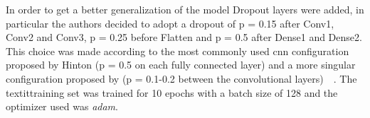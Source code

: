 In order to get a better generalization of the model Dropout layers were added, in particular the authors decided to adopt a dropout of p = 0.15 after Conv1, Conv2 and Conv3, p = 0.25 before Flatten and p = 0.5 after Dense1 and Dense2. This choice was made according to the most commonly used \gls{cnn} configuration proposed by Hinton (p = 0.5 on each fully connected layer) and a more singular configuration proposed by  (p = 0.1-0.2 between the convolutional layers)~\cite{Hinton12}~\cite{Sungheon17}.
The textit{training set} was trained for 10 epochs with a batch size of 128 and the optimizer used was \textit{adam}. 





